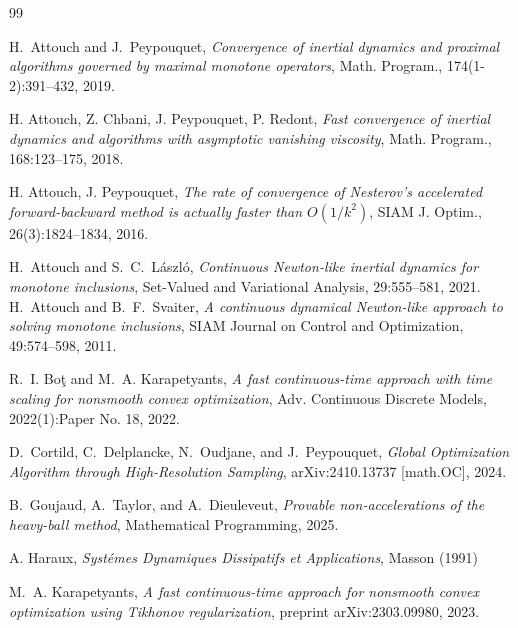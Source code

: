 \documentclass[11pt]{article}
\numberwithin{equation}{section}
\begin{document}
\begin{thebibliography}{99}

H.~Attouch and J.~Peypouquet, \textit{Convergence of inertial dynamics and proximal algorithms governed by maximal monotone operators}, Math. Program., 174(1-2):391--432, 2019.


 H. Attouch, Z. Chbani, J. Peypouquet, P. Redont, \textit{Fast convergence of inertial dynamics and algorithms with asymptotic vanishing viscosity}, Math. Program., 168:123--175, 2018.

 H. Attouch, J. Peypouquet, \textit{The rate of convergence of Nesterov’s accelerated forward-backward method is actually faster than $O(1/k^2)$}, SIAM J. Optim., 26(3):1824–1834, 2016.

H.~Attouch and S.~C.~László,
\textit{Continuous Newton-like inertial dynamics for monotone inclusions},
Set-Valued and Variational Analysis, 29:555--581, 2021.
H.~Attouch and B.~F.~Svaiter,
\textit{A continuous dynamical Newton-like approach to solving monotone inclusions},
SIAM Journal on Control and Optimization, 49:574--598, 2011.

R.~I. Boţ and M.~A. Karapetyants, \textit{A fast continuous-time approach with time scaling for nonsmooth convex optimization}, Adv. Continuous Discrete Models, 2022(1):Paper No. 18, 2022.

D.~Cortild, C.~Delplancke, N.~Oudjane, and J.~Peypouquet,
\textit{Global Optimization Algorithm through High-Resolution Sampling},
arXiv:2410.13737 [math.OC], 2024.

B.~Goujaud, A.~Taylor, and A.~Dieuleveut,
\textit{Provable non-accelerations of the heavy-ball method},
Mathematical Programming, 2025.

 {A. Haraux}, \textit{Systémes Dynamiques Dissipatifs et Applications}, Masson (1991)

M.~A. Karapetyants, \textit{A fast continuous-time approach for nonsmooth convex optimization using Tikhonov regularization}, preprint arXiv:2303.09980, 2023.


\end{thebibliography}
\end{document}
